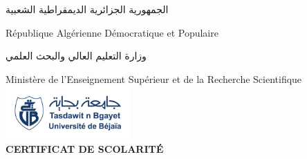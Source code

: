 \documentclass[a4paper,12pt]{article}
\begin{document}
\pagestyle{empty}
\begin{center}
\begin{otherlanguage}{arabic}الجمهورية الجزائرية الديمقراطية الشعبية\\
\end{otherlanguage}République Algérienne Démocratique et Populaire\\
\begin{otherlanguage}{arabic}وزارة التعليم العالي والبحث العلمي\\
\end{otherlanguage}Ministère de l'Enseignement Supérieur et de la Recherche Scientifique\\
\includegraphics[width=4.8cm]{Logo_Univ_Bejaia}\\\textbf{CERTIFICAT DE SCOLARITÉ}\\
\vline
\end{center}
\end{document}

